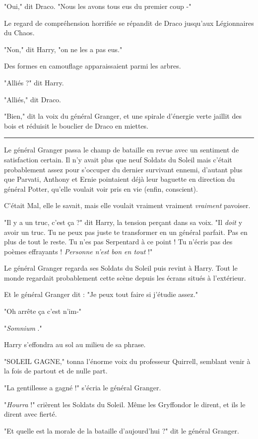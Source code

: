 "Oui," dit Draco. "Nous les avons tous eus du premier coup -"

Le regard de compréhension horrifiée se répandit de Draco jusqu'aux Légionnaires du Chaos.

"Non," dit Harry, "on ne les a pas eus."

Des formes en camouflage apparaissaient parmi les arbres.

"Alliés ?" dit Harry.

"Alliés," dit Draco.

"Bien," dit la voix du général Granger, et une spirale d'énergie verte jaillit des bois et réduisit le bouclier de Draco en miettes.
\par\noindent\rule{\textwidth}{0.4pt}
Le général Granger passa le champ de bataille en revue avec un sentiment de satisfaction certain. Il n'y avait plus que neuf Soldats du Soleil mais c'était probablement assez pour s'occuper du dernier survivant ennemi, d'autant plus que Parvati, Anthony et Ernie pointaient déjà leur baguette en direction du général Potter, qu'elle voulait voir pris en vie (enfin, conscient).

C'était Mal, elle le savait, mais elle voulait vraiment vraiment \emph{vraiment}  pavoiser.

"Il y a un truc, c'est ça ?" dit Harry, la tension perçant dans sa voix. "Il \emph{doit } y avoir un truc. Tu ne peux pas juste te transformer en un général parfait. Pas en plus de tout le reste. Tu n'es pas Serpentard à ce point ! Tu n'écris pas des poèmes effrayants ! \emph{Personne n'est bon en tout}  !"

Le général Granger regarda ses Soldats du Soleil puis revint à Harry. Tout le monde regardait probablement cette scène depuis les écrans situés à l'extérieur.

Et le général Granger dit : "Je peux tout faire si j'étudie assez."

"Oh arrête ça c'est n'im-"

"\emph{Somnium} ."

Harry s'effondra au sol au milieu de sa phrase.

"SOLEIL GAGNE," tonna l'énorme voix du professeur Quirrell, semblant venir à la fois de partout et de nulle part.

"La gentillesse a gagné !" s'écria le général Granger.

"\emph{Hourra}  !" crièrent les Soldats du Soleil. Même les Gryffondor le dirent, et ils le dirent avec fierté.

"Et quelle est la morale de la bataille d'aujourd'hui ?" dit le général Granger.

